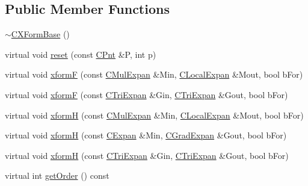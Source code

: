 \subsection*{Public Member Functions}
\begin{DoxyCompactItemize}
\item 
\hyperlink{classCXFormBase_a7d8bd2a4cb97c1f168466e06500cd20b}{$\sim$\-C\-X\-Form\-Base} ()
\item 
virtual void \hyperlink{classCXFormBase_a62ca31607107de9eba3c5190541a7598}{reset} (const \hyperlink{classCPnt}{C\-Pnt} \&P, int p)
\item 
virtual void \hyperlink{classCXFormBase_a41fa7934e0937f0da136d419488f1bea}{xform\-F} (const \hyperlink{classCMulExpan}{C\-Mul\-Expan} \&Min, \hyperlink{classCLocalExpan}{C\-Local\-Expan} \&Mout, bool b\-For)
\item 
virtual void \hyperlink{classCXFormBase_a3bb720f48d6c43f73a064c73a29c5efd}{xform\-F} (const \hyperlink{classCTriExpan}{C\-Tri\-Expan} \&Gin, \hyperlink{classCTriExpan}{C\-Tri\-Expan} \&Gout, bool b\-For)
\item 
virtual void \hyperlink{classCXFormBase_a1356f902576880830991f637036494d9}{xform\-H} (const \hyperlink{classCMulExpan}{C\-Mul\-Expan} \&Min, \hyperlink{classCLocalExpan}{C\-Local\-Expan} \&Mout, bool b\-For)
\item 
virtual void \hyperlink{classCXFormBase_a1cbf87c9b508c2ea2e558d298ff9af73}{xform\-H} (const \hyperlink{classCExpan}{C\-Expan} \&Min, \hyperlink{classCGradExpan}{C\-Grad\-Expan} \&Gout, bool b\-For)
\item 
virtual void \hyperlink{classCXFormBase_a11c0c4624ddcc5ceb416b14c21d26549}{xform\-H} (const \hyperlink{classCTriExpan}{C\-Tri\-Expan} \&Gin, \hyperlink{classCTriExpan}{C\-Tri\-Expan} \&Gout, bool b\-For)
\item 
virtual int \hyperlink{classCXFormBase_ab1e5f25024288d18deb58d0c220a0de1}{get\-Order} () const 
\end{DoxyCompactItemize}
